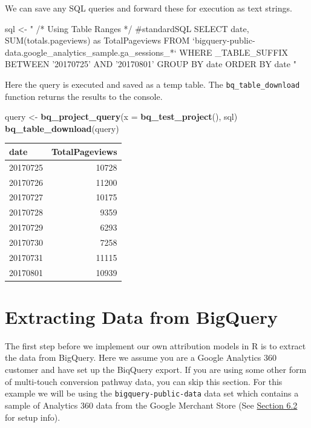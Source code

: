 \documentclass[]{book}
\newenvironment{Shaded}{\begin{snugshade}}{\end{snugshade}}
\newcommand{\KeywordTok}[1]{\textcolor[rgb]{0.13,0.29,0.53}{\textbf{#1}}}
\newcommand{\DataTypeTok}[1]{\textcolor[rgb]{0.13,0.29,0.53}{#1}}
\newcommand{\StringTok}[1]{\textcolor[rgb]{0.31,0.60,0.02}{#1}}
\newcommand{\NormalTok}[1]{#1}
\begin{document}
We can save any SQL queries and forward these for execution as text
strings.

\begin{Shaded}
\begin{Highlighting}[]
\NormalTok{sql <-}\StringTok{ "}
\StringTok{  /* Using Table Ranges */}
\StringTok{  #standardSQL}
\StringTok{  SELECT  date, }
\StringTok{        SUM(totals.pageviews) as TotalPageviews}
\StringTok{  }
\StringTok{  FROM  `bigquery-public-data.google_analytics_sample.ga_sessions_*`}
\StringTok{  }
\StringTok{  WHERE _TABLE_SUFFIX BETWEEN '20170725' AND '20170801'}
\StringTok{  }
\StringTok{  GROUP BY date}
\StringTok{  }
\StringTok{  ORDER BY date}
\StringTok{  "}
\end{Highlighting}
\end{Shaded}

Here the query is executed and saved as a temp table. The
\texttt{bq\_table\_download} function returns the results to the
console.

\begin{Shaded}
\begin{Highlighting}[]
\NormalTok{query <-}\StringTok{ }\KeywordTok{bq_project_query}\NormalTok{(}\DataTypeTok{x =} \KeywordTok{bq_test_project}\NormalTok{(), sql)}
\KeywordTok{bq_table_download}\NormalTok{(query)}
\end{Highlighting}
\end{Shaded}

\begin{tabular}{l|r}
\hline
date & TotalPageviews\\
\hline
20170725 & 10728\\
\hline
20170726 & 11200\\
\hline
20170727 & 10175\\
\hline
20170728 & 9359\\
\hline
20170729 & 6293\\
\hline
20170730 & 7258\\
\hline
20170731 & 11115\\
\hline
20170801 & 10939\\
\hline
\end{tabular}

\chapter{Extracting Data from
BigQuery}\label{extracting-data-from-bigquery}

The first step before we implement our own attribution models in R is to
extract the data from BigQuery. Here we assume you are a Google
Analytics 360 customer and have set up the BiqQuery export. If you are
using some other form of multi-touch conversion pathway data, you can
skip this section. For this example we will be using the
\texttt{bigquery-public-data} data set which contains a sample of
Analytics 360 data from the Google Merchant Store (See
\protect\hyperlink{setup-1}{Section 6.2} for setup info).
\end{document}
